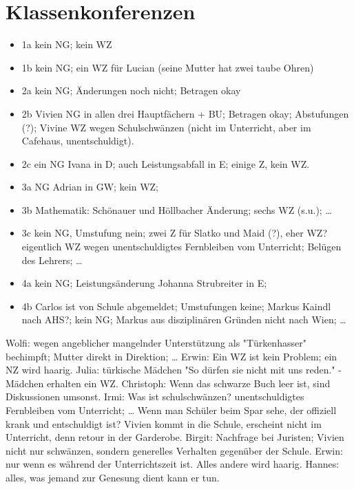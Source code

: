 \documentclass[pdftex,a4paper,12pt,bibliography=totoc]{scrartcl}
\begin{document}
\section{Klassenkonferenzen}
\label{sec:org40d0a5d}
\begin{itemize}
\item 1a kein NG; kein WZ
\item 1b kein NG; ein WZ für Lucian (seine Mutter hat zwei taube Ohren)
\item 2a kein NG; Änderungen noch nicht; Betragen okay
\item 2b Vivien NG in allen drei Hauptfächern + BU; Betragen okay; Abstufungen (?); Vivine WZ wegen Schulschwänzen (nicht im Unterricht, aber im Cafehaus, unentschuldigt).
\item 2c ein NG Ivana in D; auch Leistungsabfall in E; einige Z, kein WZ.
\item 3a NG Adrian in GW; kein WZ;
\item 3b Mathematik: Schönauer und Höllbacher Änderung; sechs WZ (s.u.); \ldots{}
\item 3c kein NG, Umstufung nein; zwei Z für Slatko und Maid (?), eher WZ? eigentlich WZ wegen unentschuldigtes Fernbleiben vom Unterricht; Belügen des Lehrers; \ldots{}
\item 4a kein NG; Leistungsänderung Johanna Strubreiter in E;
\item 4b Carlos ist von Schule abgemeldet; Umstufungen keine; Markus Kaindl nach AHS?; kein NG; Markus aus disziplinären Gründen nicht nach Wien; \ldots{}
\end{itemize}


Wolfi: wegen angeblicher mangelnder Unterstützung als "Türkenhasser" bechimpft; Mutter direkt in Direktion; \ldots{}
\newline
Erwin: Ein WZ ist kein Problem; ein NZ wird haarig. 
\newline
Julia: türkische Mädchen "So dürfen sie nicht mit uns reden." - Mädchen erhalten ein WZ.
\newline
Christoph: Wenn das schwarze Buch leer ist, sind Diskussionen umsonst. 
\newline
Irmi: Was ist schulschwänzen? unentschuldigtes Fernbleiben vom Unterricht; \ldots{} Wenn man Schüler beim Spar sehe, der offiziell krank und entschuldigt ist? Vivien kommt in die Schule, erscheint nicht im Unterricht, denn retour in der Garderobe.
\newline
Birgit: Nachfrage bei Juristen; Vivien nicht nur schwänzen, sondern generelles Verhalten gegenüber der Schule.
\newline
Erwin: nur wenn es während der Unterrichtszeit ist. Alles andere wird haarig.
\newline
Hannes: alles, was jemand zur Genesung dient kann er tun.
\end{document}
